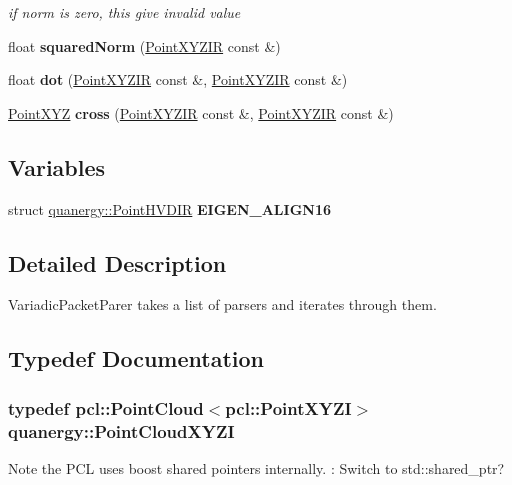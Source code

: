 \begin{DoxyCompactItemize}
\begin{DoxyCompactList}\small\item\em if norm is zero, this give invalid value \end{DoxyCompactList}\item 
\hypertarget{namespacequanergy_a7ea42d9ceb2b7589f1ad15055d39fdba}{float {\bfseries squared\-Norm} (\hyperlink{structquanergy_1_1PointXYZIR}{Point\-X\-Y\-Z\-I\-R} const \&)}\label{namespacequanergy_a7ea42d9ceb2b7589f1ad15055d39fdba}

\item 
\hypertarget{namespacequanergy_a2028b608749ca8d12b801c98b7c3cc0d}{float {\bfseries dot} (\hyperlink{structquanergy_1_1PointXYZIR}{Point\-X\-Y\-Z\-I\-R} const \&, \hyperlink{structquanergy_1_1PointXYZIR}{Point\-X\-Y\-Z\-I\-R} const \&)}\label{namespacequanergy_a2028b608749ca8d12b801c98b7c3cc0d}

\item 
\hypertarget{namespacequanergy_af8dfac35c0af4bcd5ea9202987005aa1}{\hyperlink{structquanergy_1_1PointXYZ}{Point\-X\-Y\-Z} {\bfseries cross} (\hyperlink{structquanergy_1_1PointXYZIR}{Point\-X\-Y\-Z\-I\-R} const \&, \hyperlink{structquanergy_1_1PointXYZIR}{Point\-X\-Y\-Z\-I\-R} const \&)}\label{namespacequanergy_af8dfac35c0af4bcd5ea9202987005aa1}

\end{DoxyCompactItemize}
\subsection*{Variables}
\begin{DoxyCompactItemize}
\item 
\hypertarget{namespacequanergy_a5a41f05d8d5c5a29a41c0fe688ab7f0a}{struct \hyperlink{structquanergy_1_1PointHVDIR}{quanergy\-::\-Point\-H\-V\-D\-I\-R} {\bfseries E\-I\-G\-E\-N\-\_\-\-A\-L\-I\-G\-N16}}\label{namespacequanergy_a5a41f05d8d5c5a29a41c0fe688ab7f0a}

\end{DoxyCompactItemize}


\subsection{Detailed Description}
Variadic\-Packet\-Parer takes a list of parsers and iterates through them. 

\subsection{Typedef Documentation}
\hypertarget{namespacequanergy_ae6c4851788b36d75e7142935c4ed790f}{
\subsubsection[{Point\-Cloud\-X\-Y\-Z\-I}]{\setlength{\rightskip}{0pt plus 5cm}typedef pcl\-::\-Point\-Cloud$<$pcl\-::\-Point\-X\-Y\-Z\-I$>$ {\bf quanergy\-::\-Point\-Cloud\-X\-Y\-Z\-I}}}\label{namespacequanergy_ae6c4851788b36d75e7142935c4ed790f}
Note the P\-C\-L uses boost shared pointers internally. \-: Switch to std\-::shared\-\_\-ptr? 